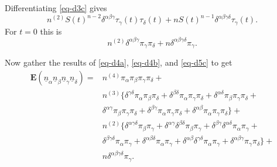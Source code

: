 \documentclass[
  12pt,
  letterpaper,
  DIV=11,
  numbers=noendperiod]{scrartcl}
\newcommand{\ul}[1]{\underline{#1}}
\begin{document}
Differentiating \eqref{eq-d3c} gives \begin{equation}
n^{(2)}S(t)^{n-2}\delta^{\alpha\beta\gamma}\tau_\gamma(t)\tau_\delta(t)+nS(t)^{n-1}\delta^{\alpha\beta\gamma\delta}\tau_\gamma(t).\label{eq-d4c}
\end{equation} For \(t=0\) this is \begin{equation}
n^{(2)}\delta^{\alpha\beta\gamma}\pi_\gamma\pi_\delta+n\delta^{\alpha\beta\gamma\delta}\pi_\gamma.\label{eq-d5c}
\end{equation}

Now gather the results of \eqref{eq-d4a}, \eqref{eq-d4b}, and
\eqref{eq-d5c} to get \begin{align}
\mathbf{E}(\ul{n}_\alpha\ul{n}_\beta\ul{n}_\gamma\ul{n}_\delta)=&n^{(4)}\pi_\alpha\pi_\beta\pi_\gamma\pi_\delta+\\
&n^{(3)}\{\delta^{\gamma\delta}\pi_\alpha\pi_\beta\pi_\delta+\delta^{\beta\delta}\pi_\alpha\pi_\gamma\pi_\delta+\delta^{\alpha\delta}\pi_\beta\pi_\gamma\pi_\delta+\\
&\delta^{\alpha\gamma}\pi_\beta\pi_\gamma\pi_\delta+\delta^{\beta\gamma}\pi_\alpha\pi_\gamma\pi_\delta+\delta^{\alpha\beta}\pi_\alpha\pi_\gamma\pi_\delta\}+\\
&n^{(2)}\{\delta^{\alpha\gamma\delta}\pi_\beta\pi_\gamma+
\delta^{\alpha\gamma}\delta^{\beta\delta}\pi_\beta\pi_\gamma+
\delta^{\beta\gamma}\delta^{\alpha\delta}\pi_\alpha\pi_\gamma+\\
&\delta^{\beta\gamma\delta}\pi_\alpha\pi_\gamma+
\delta^{\alpha\beta\delta}\pi_\alpha\pi_\gamma+
\delta^{\alpha\beta}\delta^{\gamma\delta}\pi_\alpha\pi_\gamma+\delta^{\alpha\beta\gamma}\pi_\gamma\pi_\delta\}+\\
&n\delta^{\alpha\beta\gamma\delta}\pi_\gamma.
\end{align}
\end{document}
